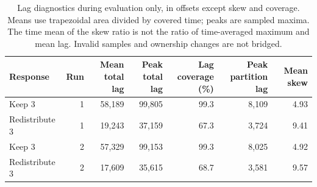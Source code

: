 \begin{table}[!htbp]
\centering\small
\setlength{\tabcolsep}{3pt}
\renewcommand{\arraystretch}{1.12}
\begin{tabular}{@{}lrrrrrr@{}}
\toprule
Response & Run & \shortstack{Mean total\\lag} & \shortstack{Peak total\\lag} & \shortstack{Lag coverage\\(\%)} & \shortstack{Peak partition\\lag} & Mean skew\\
\midrule
Keep 3 & 1 & 58,189 & 99,805 & 99.3 & 8,109 & 4.93\\
Redistribute 3 & 1 & 19,243 & 37,159 & 67.3 & 3,724 & 9.41\\
Keep 3 & 2 & 57,329 & 99,153 & 99.3 & 8,025 & 4.92\\
Redistribute 3 & 2 & 17,609 & 35,615 & 68.7 & 3,581 & 9.57\\
\bottomrule
\end{tabular}
\caption{Lag diagnostics during evaluation only, in offsets except skew and coverage. Means use trapezoidal area divided by covered time; peaks are sampled maxima. The time mean of the skew ratio is not the ratio of time-averaged maximum and mean lag. Invalid samples and ownership changes are not bridged.}
\label{tab:short-redistribution-diagnostics}
\end{table}
